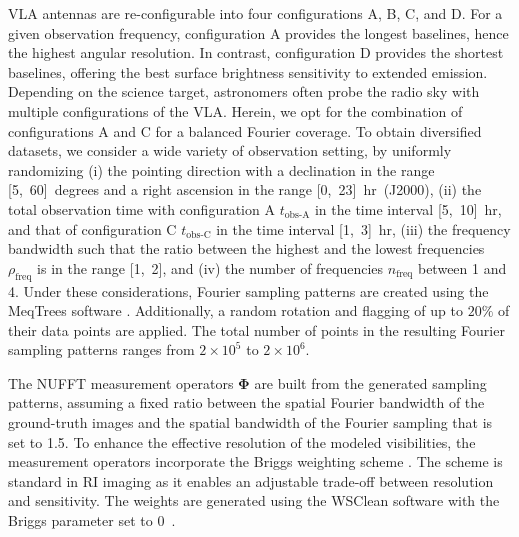 \documentclass[preprint2,twocolumn]{aastex631}
\newcommand{\Phib}{\ensuremath{\boldsymbol{\Phi}}}
\begin{document}
VLA antennas are re-configurable into four configurations A, B, C, and D. For a given observation frequency, configuration A provides the longest baselines, hence the highest angular resolution. In contrast, configuration D provides the shortest baselines, {offering the best surface brightness sensitivity to extended emission}. Depending on the science target, astronomers often probe the radio sky with multiple configurations of the VLA. Herein, we opt for the combination of configurations A and C for a balanced Fourier coverage. To obtain diversified datasets, we consider a wide variety of observation setting, by uniformly randomizing (i) the pointing direction with a declination in the range [5,~60]~degrees and a right ascension in the range [0,~23]~hr~(J2000), (ii) the total observation time with configuration A $t_{\textrm{obs-A}}$ in the time interval [5,~10]~hr, and that of configuration C $t_{\textrm{obs-C}}$ in the time interval [1,~{3}]~hr, (iii) the frequency bandwidth such that the ratio between the highest and the lowest frequencies $\rho_{\textrm{freq}}$ is in the range [1,~2], and (iv) the number of frequencies $n_{\textrm{freq}}$ between 1 and 4. Under these considerations, Fourier sampling patterns are created using the MeqTrees software \citep{Noordam2010}. Additionally, a random rotation and flagging of up to $20 \%$ of their data points are applied. The total number of points in the resulting Fourier sampling patterns ranges from $2\times 10^5$ to $2\times 10^6$.

The NUFFT measurement operators $\Phib$ are built from the generated sampling patterns, assuming a fixed ratio between the spatial Fourier bandwidth of the ground-truth images and the spatial bandwidth of the Fourier sampling that is set to 1.5. To enhance the effective resolution of the modeled visibilities, the measurement operators incorporate the Briggs weighting scheme \citep{briggs1995}. The scheme is standard in RI imaging as it enables an adjustable trade-off between resolution and sensitivity. The weights are generated using the WSClean software with the Briggs parameter set to 0~\citep{offringa2014,offringa2017}.
\end{document}
